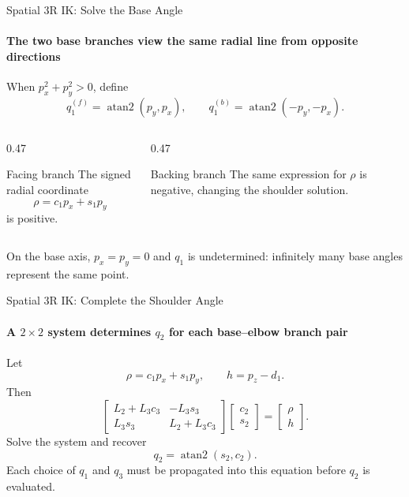 \documentclass[aspectratio=169]{beamer}
\begin{document}
\begin{frame}[t]{Spatial 3R IK: Solve the Base Angle}
    \framesubtitle{The two base branches view the same radial line from opposite directions}
    When $p_x^2+p_y^2>0$, define
    \[
        q_1^{(f)}=\operatorname{atan2}(p_y,p_x),
        \qquad
        q_1^{(b)}=\operatorname{atan2}(-p_y,-p_x).
    \]
    \begin{columns}[T,onlytextwidth]
        \begin{column}{0.47\textwidth}
            \begin{block}{Facing branch}
                The signed radial coordinate
                \[
                    \rho=c_1p_x+s_1p_y
                \]
                is positive.
            \end{block}
        \end{column}
        \begin{column}{0.47\textwidth}
            \begin{block}{Backing branch}
                The same expression for $\rho$ is negative, changing the shoulder solution.
            \end{block}
        \end{column}
    \end{columns}
    \medskip
    On the base axis, $p_x=p_y=0$ and $q_1$ is undetermined: infinitely many base angles represent the same point.
\end{frame}

\begin{frame}[t]{Spatial 3R IK: Complete the Shoulder Angle}
    \framesubtitle{A $2\times2$ system determines $q_2$ for each base--elbow branch pair}
    Let
    \[
        \rho=c_1p_x+s_1p_y,
        \qquad h=p_z-d_1.
    \]
    Then
    \[
        \begin{bmatrix}
            L_2+L_3c_3 & -L_3s_3\\
            L_3s_3 & L_2+L_3c_3
        \end{bmatrix}
        \begin{bmatrix}c_2\\s_2\end{bmatrix}
        =
        \begin{bmatrix}\rho\\h\end{bmatrix}.
    \]
    Solve the system and recover
    \[
        q_2=\operatorname{atan2}(s_2,c_2).
    \]
    Each choice of $q_1$ and $q_3$ must be propagated into this equation before $q_2$ is evaluated.
\end{frame}
\end{document}
